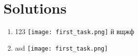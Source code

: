 \documentclass{article}
\begin{document}

\section*{Solutions}
\begin{enumerate}
        \item 123 \makebox[0pt][l]{}
        \texttt{[image: first\_task.png]}
    й   вщжф
        \item asd \makebox[0pt][l]{}
        \texttt{[image: first\_task.png]}
\end{enumerate}
\end{document}
